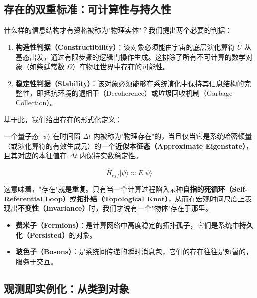\subsection{存在的双重标准：可计算性与持久性}

什么样的信息结构才有资格被称为"物理实体"？我们提出两个必要的判据：

\begin{enumerate}
\item \textbf{构造性判据（Constructibility）}：该对象必须能由宇宙的底层演化算符 $\hat{U}$ 从基态出发，通过有限步骤的逻辑门操作生成。这排除了所有不可计算的数学对象（如柴廷常数 $\Omega$）在物理世界中存在的可能性。

\item \textbf{稳定性判据（Stability）}：该对象必须能够在系统演化中保持其信息结构的完整性，即抵抗环境的退相干（Decoherence）或垃圾回收机制（Garbage Collection）。
\end{enumerate}

基于此，我们给出存在的形式化定义：

\begin{definition}[物理存在]
一个量子态 $|\psi\rangle$ 在时间窗 $\Delta t$ 内被称为"物理存在"的，当且仅当它是系统哈密顿量（或演化算符的有效生成元）的一个\textbf{近似本征态（Approximate Eigenstate）}，且其对应的本征值在 $\Delta t$ 内保持实数稳定性。

\begin{equation}
\hat{H}_{eff} |\psi\rangle \approx E |\psi\rangle
\end{equation}
\end{definition}

这意味着，"存在"就是\textbf{重复}。只有当一个计算过程陷入某种\textbf{自指的死循环（Self-Referential Loop）}或\textbf{拓扑结（Topological Knot）}，从而在宏观时间尺度上表现出\textbf{不变性（Invariance）}时，我们才说有一个"物体"存在于那里。

\begin{itemize}
\item \textbf{费米子（Fermions）}：是计算网络中高度稳定的拓扑孤子，它们是系统中\textbf{持久化（Persisted）}的对象。

\item \textbf{玻色子（Bosons）}：是系统间传递的瞬时消息包，它们的存在往往是短暂的，服务于交互。
\end{itemize}

\subsection{观测即实例化：从类到对象}

